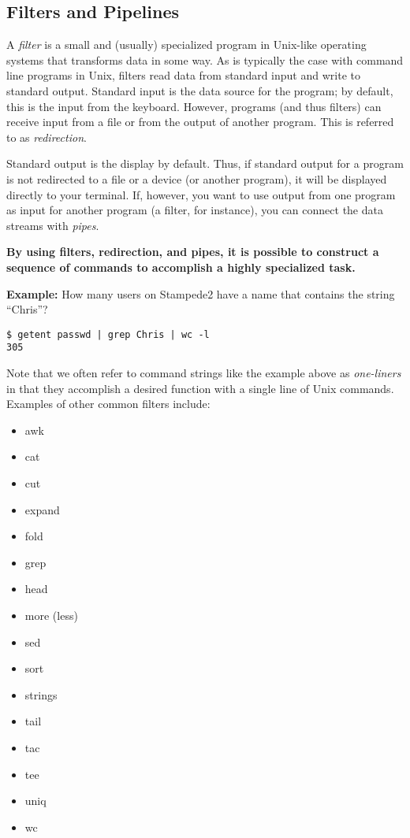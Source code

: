 \documentclass[letterpaper,12pt]{article}
\newcommand{\system}{Stampede2}
\begin{document}
{\newpage
\subsection*{Filters and Pipelines}

A \textit{filter} is a small and (usually) specialized program in Unix-like
operating systems that transforms data in some way.  As is typically the case
with command line programs in Unix, filters read data from standard input and
write to standard output.  Standard input is the data source for the program;
by default, this is the input from the keyboard. However, programs (and thus
filters) can receive input from a file or from the output of another
program. This is referred to as \textit{redirection}.

Standard output is the display by default. Thus, if standard output
for a program is not redirected to a file or a device (or another
program), it will be displayed directly to your terminal. If, however,
you want to use output from one program as input for another program
(a filter, for instance), you can connect the data streams with
\textit{pipes}.

\smallskip

\noindent \textbf{By using filters, redirection, and pipes, it is possible to
  construct a sequence of commands to accomplish a highly specialized
  task.}

\bigskip

\noindent \textbf{Example:} How many users on \system{} have a name that contains the string ``Chris''?

\begin{verbatim}
$ getent passwd | grep Chris | wc -l
305
\end{verbatim}

Note that we often refer to command strings like the example above as
{\em one-liners} in that they accomplish a desired function with a
single line of Unix commands.   \\

\noindent Examples of other common filters include:

\begin{multicols}{3}
\begin{itemize}[nolistsep]
    \item awk
    \item cat
    \item cut
    \item expand
    \item fold
    \item grep
    \item head
    \item more (less)
    \item sed 
    \item sort
    \item strings
    \item tail
    \item tac
    \item tee
    \item uniq
    \item wc
\end{itemize}
\end{multicols}

}
\end{document}
